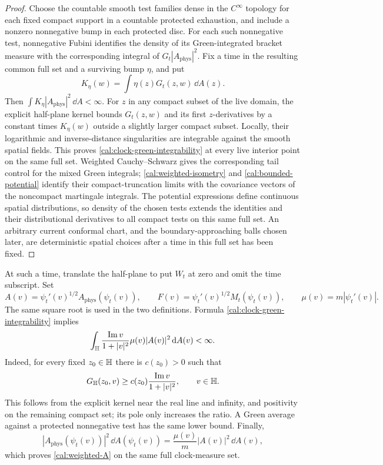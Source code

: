 \begin{proof}
Choose the countable smooth test families dense in the $C^\infty$
topology for each fixed compact support in a countable protected
exhaustion, and include a nonzero nonnegative bump in each protected
disc.  For each such nonnegative test, nonnegative Fubini identifies
the density of its Green-integrated bracket measure with the
corresponding integral of $G_t|A_{\mathrm{phys}}|^2$.  Fix a time in
the resulting common full set and a surviving bump $\eta$, and put
\[
 K_\eta(w)=\int\eta(z)G_t(z,w)\,\dd A(z).
\]
Then $\int K_\eta|A_{\mathrm{phys}}|^2\,\dd A<\infty$.
For $z$ in any compact subset of the live domain, the explicit
half-plane kernel bounds $G_t(z,w)$ and its first $z$-derivatives by
a constant times $K_\eta(w)$ outside a slightly larger compact subset.
Locally, their logarithmic and inverse-distance singularities are
integrable against the smooth spatial fields.  This proves
\eqref{cal:clock-green-integrability} at every live interior point
on the same full set.  Weighted Cauchy--Schwarz gives the corresponding
tail control for the mixed Green integrals; \eqref{cal:weighted-isometry}
and \eqref{cal:bounded-potential} identify their compact-truncation
limits with the covariance vectors of the noncompact martingale
integrals.  The potential expressions define continuous spatial
distributions, so density of the chosen tests extends the identities
and their distributional derivatives to all compact tests on this
same full set.  An arbitrary current conformal chart, and the
boundary-approaching balls chosen later, are deterministic spatial
choices after a time in this full set has been fixed.
\end{proof}

At such a time, translate the half-plane to put $W_t$ at zero and omit
the time subscript.  Set
\[
 A(v)=\psi_t'(v)^{1/2}A_{\mathrm{phys}}(\psi_t(v)),
 \qquad F(v)=\psi_t'(v)^{1/2}M_t(\psi_t(v)),
 \qquad \mu(v)=m|\psi_t'(v)|.
\]
The same square root is used in the two definitions.  Formula
\eqref{cal:clock-green-integrability} implies
\begin{equation}
 \int_{\mathbb H}\frac{\operatorname{Im}v}{1+|v|^2}
                    \mu(v)|A(v)|^2\,\mathrm d A(v)<\infty.
 \label{cal:weighted-A}
\end{equation}
Indeed, for every fixed $z_0\in\mathbb H$ there is $c(z_0)>0$ such that
\[
 G_{\mathbb H}(z_0,v)\geq
       c(z_0)\frac{\operatorname{Im}v}{1+|v|^2},\qquad v\in\mathbb H.
\]
This follows from the explicit kernel near the real line and infinity,
and positivity on the remaining compact set; its pole only increases
the ratio.  A Green average against a protected nonnegative test has
the same lower bound.  Finally,
\[
 |A_{\mathrm{phys}}(\psi_t(v))|^2\,\dd A(\psi_t(v))
       =\frac{\mu(v)}m|A(v)|^2\,\dd A(v),
\]
which proves \eqref{cal:weighted-A} on the same full clock-measure set.

